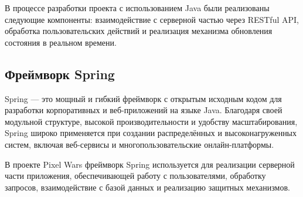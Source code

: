 В процессе разработки проекта с использованием Java были реализованы следующие компоненты: взаимодействие с серверной частью через RESTful API, обработка пользовательских действий и реализация механизма обновления состояния в реальном времени.


\subsection{Фреймворк Spring}


Spring --- это мощный и гибкий фреймворк с открытым исходным кодом для разработки корпоративных и веб-приложений на языке Java. Благодаря своей модульной структуре, высокой производительности и удобству масштабирования, Spring широко применяется при создании распределённых и высоконагруженных систем, включая веб-сервисы и многопользовательские онлайн-платформы.


В проекте Pixel Wars фреймворк Spring используется для реализации серверной части приложения, обеспечивающей работу с пользователями, обработку запросов, взаимодействие с базой данных и реализацию защитных механизмов.

